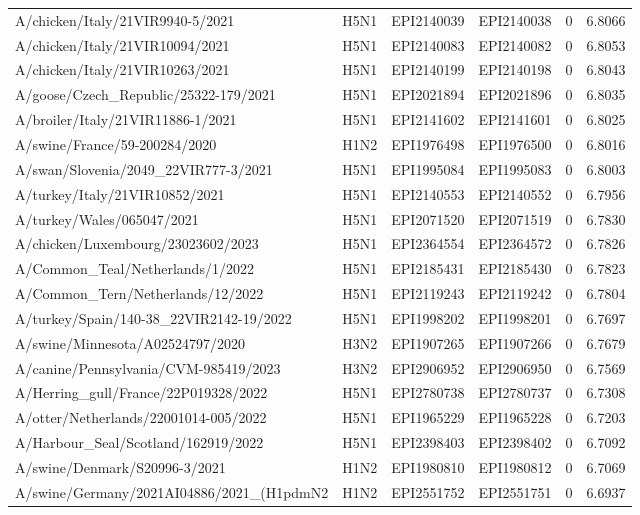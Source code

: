 \begin{tabular}{L{1.95in}|L{.25in}|L{.60in}|L{.6in}|C{1in}|C{1in}}
A/chicken/Italy/21VIR9940-5/2021&H5N1&EPI2140039&EPI2140038&0&6.8066\\
A/chicken/Italy/21VIR10094/2021&H5N1&EPI2140083&EPI2140082&0&6.8053\\
A/chicken/Italy/21VIR10263/2021&H5N1&EPI2140199&EPI2140198&0&6.8043\\
A/goose/Czech\_Republic/25322-179/2021&H5N1&EPI2021894&EPI2021896&0&6.8035\\
A/broiler/Italy/21VIR11886-1/2021&H5N1&EPI2141602&EPI2141601&0&6.8025\\
A/swine/France/59-200284/2020&H1N2&EPI1976498&EPI1976500&0&6.8016\\
A/swan/Slovenia/2049\_22VIR777-3/2021&H5N1&EPI1995084&EPI1995083&0&6.8003\\
A/turkey/Italy/21VIR10852/2021&H5N1&EPI2140553&EPI2140552&0&6.7956\\
A/turkey/Wales/065047/2021&H5N1&EPI2071520&EPI2071519&0&6.7830\\
A/chicken/Luxembourg/23023602/2023&H5N1&EPI2364554&EPI2364572&0&6.7826\\
A/Common\_Teal/Netherlands/1/2022&H5N1&EPI2185431&EPI2185430&0&6.7823\\
A/Common\_Tern/Netherlands/12/2022&H5N1&EPI2119243&EPI2119242&0&6.7804\\
A/turkey/Spain/140-38\_22VIR2142-19/2022&H5N1&EPI1998202&EPI1998201&0&6.7697\\
A/swine/Minnesota/A02524797/2020&H3N2&EPI1907265&EPI1907266&0&6.7679\\
A/canine/Pennsylvania/CVM-985419/2023&H3N2&EPI2906952&EPI2906950&0&6.7569\\
A/Herring\_gull/France/22P019328/2022&H5N1&EPI2780738&EPI2780737&0&6.7308\\
A/otter/Netherlands/22001014-005/2022&H5N1&EPI1965229&EPI1965228&0&6.7203\\
A/Harbour\_Seal/Scotland/162919/2022&H5N1&EPI2398403&EPI2398402&0&6.7092\\
A/swine/Denmark/S20996-3/2021&H1N2&EPI1980810&EPI1980812&0&6.7069\\
A/swine/Germany/2021AI04886/2021\_(H1pdmN2&H1N2&EPI2551752&EPI2551751&0&6.6937\\

\end{tabular}

